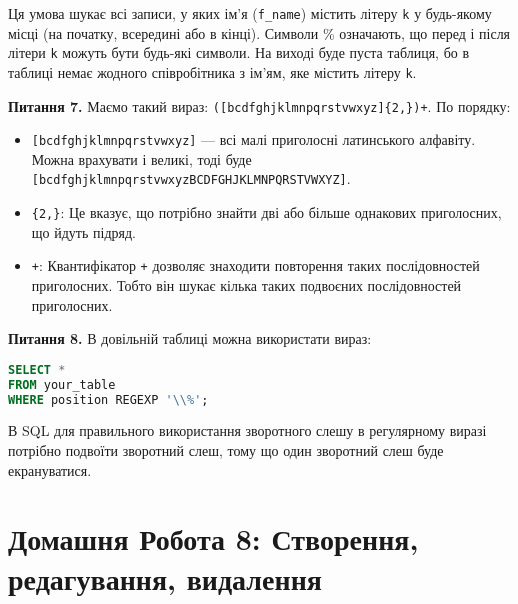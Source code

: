 \documentclass{hw_template}
\begin{document}
Ця умова шукає всі записи, у яких ім'я (\texttt{f\_name}) містить літеру
\texttt{k} у будь-якому місці (на початку, всередині або в кінці). Символи \%
означають, що перед і після літери \texttt{k} можуть бути будь-які символи.
На виході буде пуста таблиця, бо в таблиці немає жодного співробітника з ім'ям,
яке містить літеру \texttt{k}.

\textbf{Питання 7.} Маємо такий вираз: \texttt{([bcdfghjklmnpqrstvwxyz]\{2,\})+}. По порядку:
\begin{itemize}
    \item \texttt{[bcdfghjklmnpqrstvwxyz]} --- всі малі приголосні латинського алфавіту. Можна врахувати і великі, тоді буде \texttt{[bcdfghjklmnpqrstvwxyzBCDFGHJKLMNPQRSTVWXYZ]}.
    \item \texttt{\{2,\}}: Це вказує, що потрібно знайти дві або більше однакових приголосних, що йдуть підряд.
    \item \texttt{+}: Квантифікатор \texttt{+} дозволяє знаходити повторення таких послідовностей приголосних. Тобто він шукає кілька таких подвоєних послідовностей приголосних.
\end{itemize}

\textbf{Питання 8.} В довільній таблиці можна використати вираз:
\begin{lstlisting}[language=SQL]
SELECT * 
FROM your_table
WHERE position REGEXP '\\%';
\end{lstlisting}

В SQL для правильного використання зворотного слешу в регулярному виразі
потрібно подвоїти зворотний слеш, тому що один зворотний слеш буде
екрануватися.

\newpage

\section{Домашня Робота 8: Створення, редагування, видалення}
\end{document}
